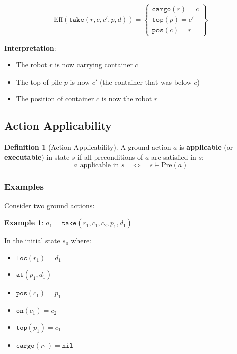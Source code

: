 \documentclass[11pt,a4paper]{article}
\theoremstyle{definition}
\newtheorem{definition}{Definition}[section]
\theoremstyle{plain}
\theoremstyle{remark}
\begin{document}
\[
\text{Eff}(\texttt{take}(r, c, c', p, d)) = \left\{
\begin{array}{l}
\texttt{cargo}(r) = c \\
\texttt{top}(p) = c' \\
\texttt{pos}(c) = r
\end{array}
\right\}
\]

\textbf{Interpretation}:
\begin{itemize}
    \item The robot $r$ is now carrying container $c$
    \item The top of pile $p$ is now $c'$ (the container that was below $c$)
    \item The position of container $c$ is now the robot $r$
\end{itemize}

\subsection{Action Applicability}

\begin{tcolorbox}[colback=purple!5!white,colframe=purple!75!black,title=\textbf{Action Applicability}]
\begin{definition}[Action Applicability]
A ground action $a$ is \textbf{applicable} (or \textbf{executable}) in state $s$ if all preconditions of $a$ are satisfied in $s$:
\[
a \text{ applicable in } s \quad \Leftrightarrow \quad s \models \text{Pre}(a)
\]
\end{definition}
\end{tcolorbox}

\subsubsection{Examples}

Consider two ground actions:

\textbf{Example 1}: $a_1 = \texttt{take}(r_1, c_1, c_2, p_1, d_1)$

In the initial state $s_0$ where:
\begin{itemize}
    \item $\texttt{loc}(r_1) = d_1$
    \item $\texttt{at}(p_1, d_1)$
    \item $\texttt{pos}(c_1) = p_1$
    \item $\texttt{on}(c_1) = c_2$
    \item $\texttt{top}(p_1) = c_1$
    \item $\texttt{cargo}(r_1) = \texttt{nil}$
\end{itemize}
\end{document}
